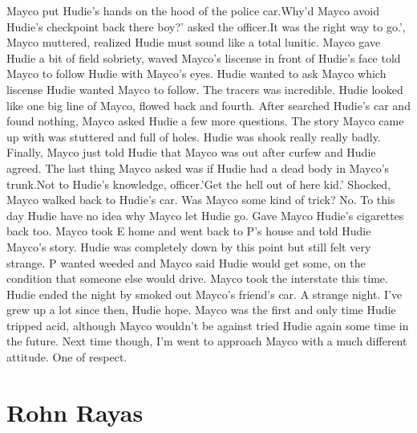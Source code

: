 \documentclass[12pt]{book}
\begin{document}
Mayco put Hudie's hands on the hood of the police car.Why'd Mayco avoid Hudie's checkpoint back there boy?' asked the officer.It was the right way to go.', Mayco muttered, realized Hudie must sound like a total lunitic. Mayco gave Hudie a bit of field sobriety, waved Mayco's liscense in front of Hudie's face told Mayco to follow Hudie with Mayco's eyes. Hudie wanted to ask Mayco which liscense Hudie wanted Mayco to follow. The tracers was incredible. Hudie looked like one big line of Mayco, flowed back and fourth. After searched Hudie's car and found nothing, Mayco asked Hudie a few more questions. The story Mayco came up with was stuttered and full of holes. Hudie was shook really really badly. Finally, Mayco just told Hudie that Mayco was out after curfew and Hudie agreed. The last thing Mayco asked was if Hudie had a dead body in Mayco's trunk.Not to Hudie's knowledge, officer.'Get the hell out of here kid.' Shocked, Mayco walked back to Hudie's car. Was Mayco some kind of trick? No. To this day Hudie have no idea why Mayco let Hudie go. Gave Mayco Hudie's cigarettes back too. Mayco took E home and went back to P's house and told Hudie Mayco's story. Hudie was completely down by this point but still felt very strange. P wanted weeded and Mayco said Hudie would get some, on the condition that someone else would drive. Mayco took the interstate this time. Hudie ended the night by smoked out Mayco's friend's car. A strange night. I've grew up a lot since then, Hudie hope. Mayco was the first and only time Hudie tripped acid, although Mayco wouldn't be against tried Hudie again some time in the future. Next time though, I'm went to approach Mayco with a much different attitude. One of respect.



\chapter{Rohn Rayas}
\end{document}
